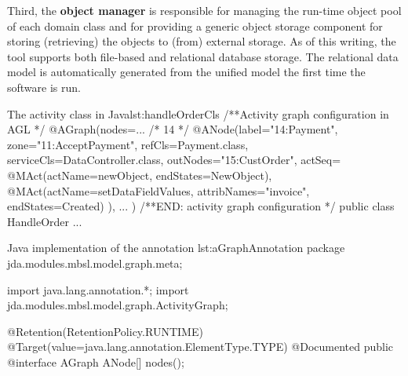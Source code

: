 Third, the \textbf{object manager} is responsible for managing the run-time object pool of each domain class and for providing a generic object storage component for storing (retrieving) the objects to (from) external storage. As of this writing, the tool supports both file-based and relational database storage. The relational data model is automatically generated from the unified model the first time the software is run.

\noindent\begin{minipage}{.55\textwidth}
\begin{lstcodeplainssm}{The activity class  in Java}{lst:handleOrderCls}
/**Activity graph configuration in AGL */
@AGraph(nodes={...	
	/* 14 */    
	@ANode(label="14:Payment", zone="11:AcceptPayment",
		refCls=Payment.class, serviceCls=DataController.class, 
		outNodes={"15:CustOrder"},
		actSeq={
			@MAct(actName=newObject, endStates={NewObject}),
			@MAct(actName=setDataFieldValues, attribNames={"invoice"},
				endStates={Created})
		}), ...
})
/**END: activity graph configuration */
public class HandleOrder {...}
\end{lstcodeplainssm}
\end{minipage}
\begin{minipage}{.45\textwidth}
\begin{lstcodeplainssm}{Java implementation of the annotation }{lst:aGraphAnnotation}
package jda.modules.mbsl.model.graph.meta;

import java.lang.annotation.*;
import jda.modules.mbsl.model.graph.ActivityGraph;

@Retention(RetentionPolicy.RUNTIME)
@Target(value=java.lang.annotation.ElementType.TYPE)
@Documented
public @interface AGraph {
	ANode[] nodes();
}
\end{lstcodeplainssm}	
\end{minipage}

